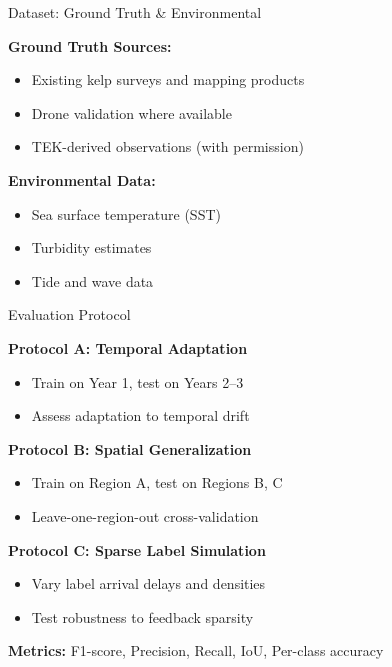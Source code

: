 \documentclass[10pt,xcolor={table,dvipsnames},t]{beamer}
\begin{document}
\begin{frame}{Dataset: Ground Truth \& Environmental}

\textbf{Ground Truth Sources:}
\begin{itemize}
  \item Existing kelp surveys and mapping products
  \item Drone validation where available
  \item TEK-derived observations (with permission)
\end{itemize}

\vspace{0.5em}
\textbf{Environmental Data:}
\begin{itemize}
  \item Sea surface temperature (SST)
  \item Turbidity estimates
  \item Tide and wave data
\end{itemize}

\end{frame}

\begin{frame}{Evaluation Protocol}

\textbf{Protocol A: Temporal Adaptation}
\begin{itemize}
  \item Train on Year 1, test on Years 2--3
  \item Assess adaptation to temporal drift
\end{itemize}

\textbf{Protocol B: Spatial Generalization}
\begin{itemize}
  \item Train on Region A, test on Regions B, C
  \item Leave-one-region-out cross-validation
\end{itemize}

\textbf{Protocol C: Sparse Label Simulation}
\begin{itemize}
  \item Vary label arrival delays and densities
  \item Test robustness to feedback sparsity
\end{itemize}

\textbf{Metrics:} F1-score, Precision, Recall, IoU, Per-class accuracy

\end{frame}
\end{document}
